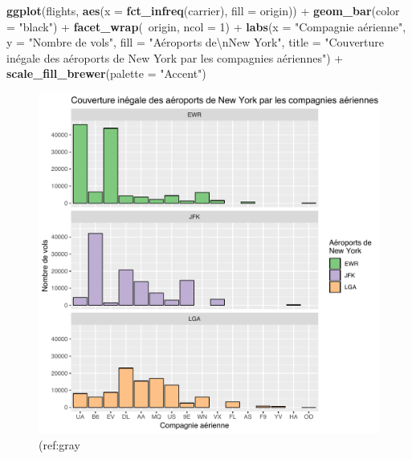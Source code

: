 \documentclass[a4paperpaper,]{article}
\newenvironment{Shaded}{\begin{snugshade}}{\end{snugshade}}
\newcommand{\CharTok}[1]{\textcolor[rgb]{0.57,0.30,0.62}{#1}}
\newcommand{\DataTypeTok}[1]{\textcolor[rgb]{0.00,0.34,0.68}{#1}}
\newcommand{\DecValTok}[1]{\textcolor[rgb]{0.69,0.50,0.00}{#1}}
\newcommand{\KeywordTok}[1]{\textcolor[rgb]{0.12,0.11,0.11}{\textbf{#1}}}
\newcommand{\NormalTok}[1]{\textcolor[rgb]{0.12,0.11,0.11}{#1}}
\newcommand{\OperatorTok}[1]{\textcolor[rgb]{0.12,0.11,0.11}{#1}}
\newcommand{\StringTok}[1]{\textcolor[rgb]{0.75,0.01,0.01}{#1}}
\theoremstyle{definition}
\theoremstyle{definition}
\theoremstyle{definition}
\theoremstyle{remark}
\begin{document}
\begin{Shaded}
\begin{Highlighting}[]
\KeywordTok{ggplot}\NormalTok{(flights, }\KeywordTok{aes}\NormalTok{(}\DataTypeTok{x =} \KeywordTok{fct_infreq}\NormalTok{(carrier), }\DataTypeTok{fill =}\NormalTok{ origin)) }\OperatorTok{+}
\StringTok{  }\KeywordTok{geom_bar}\NormalTok{(}\DataTypeTok{color =} \StringTok{"black"}\NormalTok{) }\OperatorTok{+}
\StringTok{  }\KeywordTok{facet_wrap}\NormalTok{(}\OperatorTok{~}\NormalTok{origin, }\DataTypeTok{ncol =} \DecValTok{1}\NormalTok{) }\OperatorTok{+}
\StringTok{  }\KeywordTok{labs}\NormalTok{(}\DataTypeTok{x =} \StringTok{"Compagnie aérienne"}\NormalTok{,}
       \DataTypeTok{y =} \StringTok{"Nombre de vols"}\NormalTok{,}
       \DataTypeTok{fill =} \StringTok{"Aéroports de}\CharTok{\textbackslash{}n}\StringTok{New York"}\NormalTok{,}
       \DataTypeTok{title =} \StringTok{"Couverture inégale des aéroports de New York par les compagnies aériennes"}\NormalTok{) }\OperatorTok{+}
\StringTok{  }\KeywordTok{scale_fill_brewer}\NormalTok{(}\DataTypeTok{palette =} \StringTok{"Accent"}\NormalTok{)}
\end{Highlighting}
\end{Shaded}

\begin{figure}[htpb]

{\centering \includegraphics[width=0.9\linewidth]{figure/theme1-1} 

}

\caption{(ref:gray}\label{fig:theme1}
\end{figure}
\end{document}
